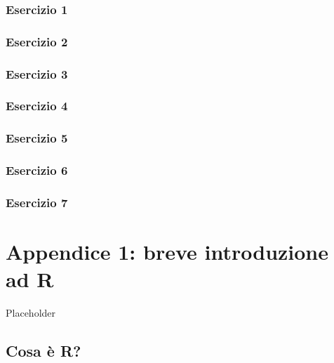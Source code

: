 \documentclass[a4paper,12pt,oneside]{book}
\begin{document}
\hypertarget{esercizio-1-9}{%
\subsection{Esercizio 1}\label{esercizio-1-9}}

\hypertarget{esercizio-2-8}{%
\subsection{Esercizio 2}\label{esercizio-2-8}}

\hypertarget{esercizio-3-7}{%
\subsection{Esercizio 3}\label{esercizio-3-7}}

\hypertarget{esercizio-4-5}{%
\subsection{Esercizio 4}\label{esercizio-4-5}}

\hypertarget{esercizio-5-4}{%
\subsection{Esercizio 5}\label{esercizio-5-4}}

\hypertarget{esercizio-6-3}{%
\subsection{Esercizio 6}\label{esercizio-6-3}}

\hypertarget{esercizio-7-2}{%
\subsection{Esercizio 7}\label{esercizio-7-2}}

\hypertarget{appendice-1-breve-introduzione-ad-r}{%
\chapter{Appendice 1: breve introduzione ad R}\label{appendice-1-breve-introduzione-ad-r}}

Placeholder

\hypertarget{cosa-uxe8-r}{%
\section*{Cosa è R?}\label{cosa-uxe8-r}}
\end{document}
